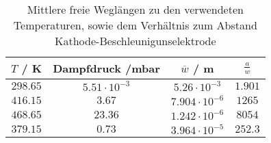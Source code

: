 \begin{table}[!htp]
\centering
\caption{Mittlere freie Weglängen zu den verwendeten Temperaturen, sowie dem Verhältnis zum Abstand Kathode-Beschleunigunselektrode }
\label{tab:weglaenge}
\begin{tabular}{c c c c}
\toprule
{{$T$ / K}} & {{Dampfdruck /mbar}} & {{$\overline{w}$ / m}} & {{$\frac{a}{w}$}} \\
\midrule
$298.65$ & $5.51\cdot 10^{-3} $ & $5.26 \cdot 10^{-3}  $ &  $ 1.901$\\
$416.15$ & $3.67 $ & $7.904 \cdot 10^{-6} $  & $  1265 $ \\
$468.65$ & $23.36$ & $1.242 \cdot 10^{-6} $  & $  8054 $ \\
$379.15$ & $0.73 $ & $3.964 \cdot 10^{-5}  $ &  $ 252.3 $ \\
\bottomrule
\end{tabular}
\end{table}